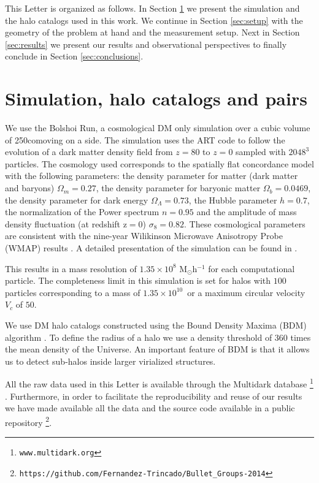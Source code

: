 \documentclass{emulateapj}
\newcommand{\hMpc}{{\ifmmode{h^{-1}{\rm Mpc}}\else{$h^{-1}$Mpc }\fi}}
\newcommand{\hMsun}{{\ifmmode{h^{-1}{\rm {M_{\odot}}}}\else{$h^{-1}{\rm{M_{\odot}}}$}\fi}}
\newcommand{\kms}{{\ifmmode{{\mathrm{\,km\ s}^{-1}}}\else{\,km~s$^{-1}$}\fi}}
\begin{document}
This Letter is organized as follows. In Section
\ref{sec:simulation} we present the simulation and the halo catalogs
used in this work. We continue in Section \ref{sec:setup} with the
geometry of the problem at hand and the measurement setup. Next in
Section \ref{sec:results} we present our results and observational
perspectives to finally conclude in Section \ref{sec:conclusions}. 

\section{Simulation, halo catalogs and pairs}
\label{sec:simulation}

We use the Bolshoi Run, a cosmological DM only simulation over a cubic
volume of 250\hMpc comoving on a side. The simulation uses the ART
code \citep{Kravtsov1997} to follow the evolution of a dark matter
density field from $z=80$ to $z=0$ sampled with $2048^3$  particles. The
cosmology used  corresponds to  the spatially flat concordance model
with the following parameters:  the density parameter for matter (dark
matter and baryons) $\Omega_m=0.27$, the density parameter for baryonic matter
$\Omega_b=0.0469$, the density parameter for dark energy
$\Omega_{\Lambda}=0.73$, the Hubble parameter $h=0.7$, the
normalization of the Power spectrum $n=0.95$ and the amplitude of mass
density fluctuation (at redshift z$=$0) $\sigma_8=0.82$.  These
cosmological parameters are consistent with the nine-year Wilikinson
Microwave Anisotropy Probe (WMAP) results \citep{hinshaw_etal13}. A
detailed presentation of the simulation can be found in \citet{2011ApJ...740..102K}.     

This results in a mass resolution of $1.35 \times 10^8$
M$_{\odot}$h$^{-1}$ for each computational particle. The completeness
limit in this simulation is set for halos with $100$ particles
corresponding to a mass of $1.35\times10^{10}$\hMsun\ or a maximum
circular velocity $V_{c}$ of $50$\kms. 

We use DM halo catalogs constructed using the Bound Density Maxima (BDM)
algorithm \citep{BDM,BDMb}. To define the radius of a halo we use a
density threshold of 360 times the mean density of the Universe. An important feature of BDM is that it allows us to detect sub-halos inside larger virialized
structures.   

All the raw data used in this Letter is available through the Multidark database \footnote{\texttt{www.multidark.org}}
\citep{Riebe2013}.  Furthermore, in order to facilitate the
reproducibility and reuse of our results we have made available all
the data and the source code available in a public
repository \footnote{\texttt{https://github.com/Fernandez-Trincado/Bullet\_Groups-2014}}.
\end{document}
